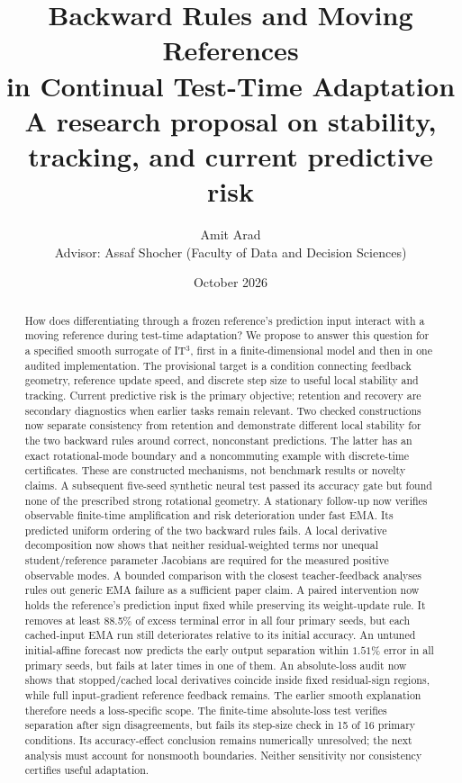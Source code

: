 \documentclass[11pt,a4paper]{article}
\title{Backward Rules and Moving References\\in Continual Test-Time Adaptation\\[0.4em]
\large A research proposal on stability, tracking, and current predictive risk}
\author{Amit Arad\\[0.3em]
\small Advisor: Assaf Shocher (Faculty of Data and Decision Sciences)}
\date{October 2026}
\begin{document}
\maketitle
\begin{abstract}
How does differentiating through a frozen reference's prediction input
interact with a moving reference during test-time adaptation? We propose
to answer this question for a specified smooth surrogate of IT$^3$, first
in a finite-dimensional model and then in one audited implementation.
The provisional target is a condition connecting feedback geometry,
reference update speed, and discrete step size to useful local stability
and tracking. Current predictive risk is the primary objective; retention
and recovery are secondary diagnostics when earlier tasks remain relevant.
Two checked constructions now separate consistency from retention and
demonstrate different local stability for the two backward rules around
correct, nonconstant predictions. The latter has an exact rotational-mode
boundary and a noncommuting example with discrete-time certificates.
These are constructed mechanisms, not benchmark results or novelty
claims. A subsequent five-seed synthetic neural test passed its accuracy
gate but found none of the prescribed strong rotational geometry. A
stationary follow-up now verifies observable finite-time amplification and
risk deterioration under fast EMA. Its predicted uniform ordering of the
two backward rules fails. A local derivative decomposition now shows that
neither residual-weighted terms nor unequal student/reference parameter
Jacobians are required for the measured positive observable modes.
A bounded comparison with the closest teacher-feedback analyses rules
out generic EMA failure as a sufficient paper claim. A paired intervention
now holds the reference's prediction input fixed while preserving its
weight-update rule. It removes at least 88.5\% of excess terminal error
in all four primary seeds, but each cached-input EMA run still deteriorates
relative to its initial accuracy. An untuned initial-affine forecast now
predicts the early output separation within $1.51\%$ error in all primary
seeds, but fails at later times in one of them. An absolute-loss audit
now shows that stopped/cached local derivatives coincide inside fixed
residual-sign regions, while full input-gradient reference feedback remains.
The earlier smooth explanation therefore needs a loss-specific scope.
The finite-time absolute-loss test verifies separation after sign
disagreements, but fails its step-size check in 15 of 16 primary
conditions. Its accuracy-effect conclusion remains numerically unresolved;
the next analysis must account for nonsmooth boundaries.
Neither sensitivity nor consistency certifies useful adaptation.
\end{abstract}
\end{document}
